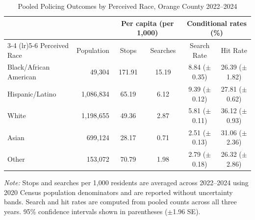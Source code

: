 \begin{table}[htbp]
\centering
\small
\caption{Pooled Policing Outcomes by Perceived Race, Orange County 2022--2024}
\label{tab:policing_pooled}
\begin{tabular}{l r cc cc}
\toprule
 & & \multicolumn{2}{c}{Per capita (per 1,000)} & \multicolumn{2}{c}{Conditional rates (\%)} \\
\cmidrule(lr){3-4} \cmidrule(lr){5-6}
Perceived Race & Population & Stops & Searches & Search Rate & Hit Rate \\
\midrule
Black/African American & 49,304 & 171.91 & 15.19 & 8.84 ({\scriptsize $\pm$0.35}) & 26.39 ({\scriptsize $\pm$1.82}) \\
Hispanic/Latino & 1,086,834 & 65.19 & 6.12 & 9.39 ({\scriptsize $\pm$0.12}) & 27.81 ({\scriptsize $\pm$0.62}) \\
White & 1,198,655 & 49.36 & 2.87 & 5.81 ({\scriptsize $\pm$0.11}) & 36.12 ({\scriptsize $\pm$0.93}) \\
Asian & 699,124 & 28.17 & 0.71 & 2.51 ({\scriptsize $\pm$0.13}) & 31.06 ({\scriptsize $\pm$2.36}) \\
Other & 153,072 & 70.79 & 1.98 & 2.79 ({\scriptsize $\pm$0.18}) & 26.32 ({\scriptsize $\pm$2.86}) \\
\bottomrule
\end{tabular}
\smallskip
\parbox{\textwidth}{\footnotesize \textit{Note:} Stops and searches per 1,000 residents are averaged across 2022--2024 using 2020 Census population denominators and are reported without uncertainty bands. Search and hit rates are computed from pooled counts across all three years. 95\% confidence intervals shown in parentheses ($\pm$1.96 SE).}
\end{table}